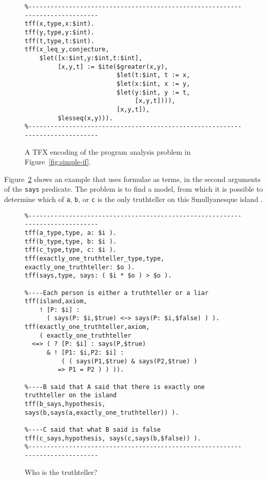 \documentclass{easychair}
\begin{document}
\begin{figure}[htbp]
\begin{small}
\begin{verbatim}
%------------------------------------------------------------------------------
tff(x,type,x:$int).
tff(y,type,y:$int).
tff(t,type,t:$int).
tff(x_leq_y,conjecture,
    $let([x:$int,y:$int,t:$int],
         [x,y,t] := $ite($greater(x,y),
                         $let(t:$int, t := x,
                         $let(x:$int, x := y,
                         $let(y:$int, y := t,
                              [x,y,t]))),
                         [x,y,t]),
         $lesseq(x,y))).
%------------------------------------------------------------------------------
\end{verbatim}
\end{small}
\caption{A TFX encoding of the program analysis problem in
Figure~\ref{fig:simple-if}.}
\label{LetITE}
\end{figure}

Figure~\ref{Truthteller} shows an example that uses formulae as terms, in
the second arguments of the {\tt says} predicate.
The problem is to find a model, from which it is possible to determine which
of {\tt a}, {\tt b}, or {\tt c} is the only truthteller on this
Smullyanesque island \cite{Smu78}.

\begin{figure}[htbp]
\begin{small}
\begin{verbatim}
%------------------------------------------------------------------------------
tff(a_type,type, a: $i ).
tff(b_type,type, b: $i ).
tff(c_type,type, c: $i ).
tff(exactly_one_truthteller_type,type, exactly_one_truthteller: $o ).
tff(says,type, says: ( $i * $o ) > $o ).

%----Each person is either a truthteller or a liar
tff(island,axiom,
    ! [P: $i] :
      ( says(P: $i,$true) <~> says(P: $i,$false) ) ).
tff(exactly_one_truthteller,axiom,
    ( exactly_one_truthteller
  <=> ( ? [P: $i] : says(P,$true)
      & ! [P1: $i,P2: $i] :
          ( ( says(P1,$true) & says(P2,$true) )
         => P1 = P2 ) ) )).

%----B said that A said that there is exactly one truthteller on the island
tff(b_says,hypothesis, says(b,says(a,exactly_one_truthteller)) ).

%----C said that what B said is false
tff(c_says,hypothesis, says(c,says(b,$false)) ).
%------------------------------------------------------------------------------
\end{verbatim}
\end{small}
\caption{Who is the truthteller?}
\label{Truthteller}
\end{figure}
\end{document}
